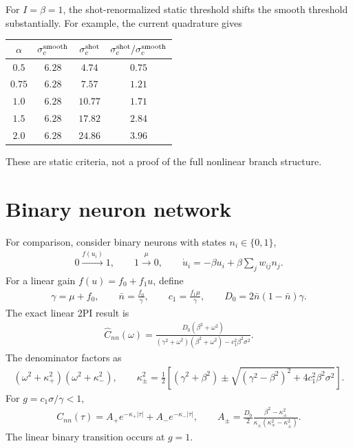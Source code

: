 \documentclass[pre,preprint,preprintnumbers,aps,eqsecnum,superscriptaddress,notitlepage,showpacs,floatfix]{revtex4-1}
\begin{document}
For $I=\beta=1$, the shot-renormalized static threshold shifts the smooth
threshold substantially.  For example, the current quadrature gives
\begin{center}
\begin{tabular}{c|ccc}
$\alpha$ & $\sigma_c^{\rm smooth}$ & $\sigma_c^{\rm shot}$ &
$\sigma_c^{\rm shot}/\sigma_c^{\rm smooth}$\\
\hline
$0.5$ & $6.28$ & $4.74$ & $0.75$\\
$0.75$ & $6.28$ & $7.57$ & $1.21$\\
$1.0$ & $6.28$ & $10.77$ & $1.71$\\
$1.5$ & $6.28$ & $17.82$ & $2.84$\\
$2.0$ & $6.28$ & $24.86$ & $3.96$
\end{tabular}
\end{center}
These are static criteria, not a proof of the full nonlinear branch structure.

\section{Binary neuron network}
\label{sec:binary}

For comparison, consider binary neurons with states $n_i\in\{0,1\}$,
\begin{align}
0\xrightarrow{f(u_i)}1,
\qquad
1\xrightarrow{\mu}0,
\qquad
\dot u_i=-\beta u_i+\beta\sum_jw_{ij}n_j.
\end{align}
For a linear gain $f(u)=f_0+f_1u$, define
\begin{align}
\gamma=\mu+f_0,
\qquad
\bar n=\frac{f_0}{\gamma},
\qquad
c_1=\frac{f_1\mu}{\gamma},
\qquad
D_0=2\bar n(1-\bar n)\gamma.
\end{align}
The exact linear 2PI result is
\begin{align}
\hat C_{nn}(\omega)
=
\frac{D_0(\beta^2+\omega^2)}
{(\gamma^2+\omega^2)(\beta^2+\omega^2)-c_1^2\beta^2\sigma^2}.
\label{eq:Cnn_exact}
\end{align}
The denominator factors as
\begin{align}
(\omega^2+\kappa_+^2)(\omega^2+\kappa_-^2),
\qquad
\kappa_\pm^2
=
\frac12\left[(\gamma^2+\beta^2)
\pm
\sqrt{(\gamma^2-\beta^2)^2+4c_1^2\beta^2\sigma^2}
\right].
\end{align}
For $g=c_1\sigma/\gamma<1$,
\begin{align}
C_{nn}(\tau)
=
A_+e^{-\kappa_+|\tau|}+A_-e^{-\kappa_-|\tau|},
\qquad
A_\pm
=
\frac{D_0}{2}
\frac{\beta^2-\kappa_\pm^2}
{\kappa_\pm(\kappa_\mp^2-\kappa_\pm^2)}.
\end{align}
The linear binary transition occurs at $g=1$.
\end{document}
